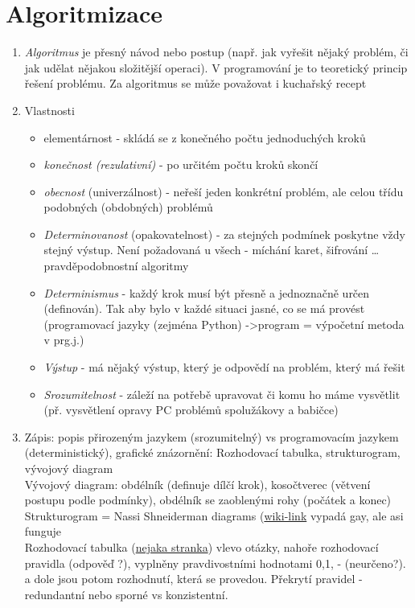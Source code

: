 \documentclass[12pt]{article}
\begin{document}
\section{Algoritmizace}
\begin{enumerate}
\item \emph{Algoritmus} je přesný návod nebo postup (např. jak vyřešit nějaký problém, či jak udělat nějakou složitější operaci). V programování je to teoretický princip řešení problému. Za algoritmus se může považovat i kuchařský recept
\item Vlastnosti
\begin{itemize}
\item elementárnost - skládá se z konečného počtu jednoduchých kroků
\item \emph{konečnost (rezulativní)} - po určitém počtu kroků skončí
\item \emph{obecnost} (univerzálnost) - neřeší jeden konkrétní problém, ale celou třídu podobných (obdobných) problémů
\item \emph{Determinovanost} (opakovatelnost) - za stejných podmínek poskytne vždy stejný výstup. Není požadovaná u všech - míchání karet, šifrování \dots pravděpodobnostní algoritmy
\item \emph{Determinismus} - každý krok musí být přesně a jednoznačně určen (definován). Tak aby bylo v každé situaci jasné, co se má provést (programovací jazyky (zejména Python) ->program = výpočetní metoda v prg.j.)
\item \emph{Výstup} - má nějaký výstup, který je odpovědí na problém, který má řešit
\item \emph{Srozumitelnost} - záleží na potřebě upravovat či komu ho máme vysvětlit (př. vysvětlení opravy PC problémů spolužákovy a babičce)
\end{itemize}
\item Zápis: popis přirozeným jazykem (srozumitelný) vs programovacím jazykem (deterministický), grafické znázornění: Rozhodovací tabulka, strukturogram, vývojový diagram\\
Vývojový diagram: obdélník (definuje dílčí krok), kosočtverec (větvení postupu podle podmínky), obdélník se zaoblenými rohy (počátek a konec)\\
Strukturogram = Nassi Shneiderman diagrams (\href{https://en.wikipedia.org/wiki/Nassi\%E2\%80\%93Shneiderman_diagram}{wiki-link} vypadá gay, ale asi funguje\\
Rozhodovací tabulka (\href{https://wikisofia.cz/wiki/Rozhodovac\%C3\%AD_tabulky_a_stromy}{nejaka stranka}) vlevo otázky, nahoře rozhodovací pravidla (odpověď ?), vyplněny pravdivostními hodnotami 0,1, - (neurčeno?). a dole jsou potom rozhodnutí, která se provedou. Překrytí pravidel - redundantní nebo sporné vs konzistentní.

\end{enumerate}
\end{document}
